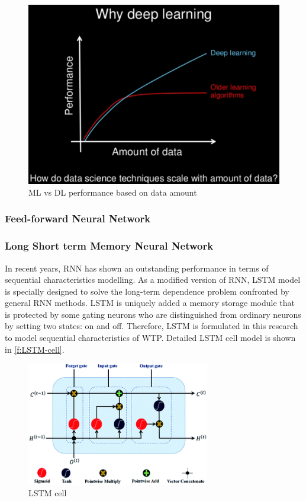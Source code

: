 \begin{figure}[h]
\centering
\includegraphics[width=12cm]{figures/Ch2/MlvsDL-data-amount.png}
\caption{ML vs DL performance based on data amount}
\label{f:ML-vs-DL-data-amount}
\end{figure}

\subsubsection{Feed-forward Neural Network}
\subsubsection{Long Short term Memory Neural Network}
In recent years, RNN has shown an outstanding performance in terms of sequential characteristics modelling. As a modified version of RNN, \ac{LSTM} model is specially designed to solve the long-term dependence problem confronted by general RNN methods. LSTM is uniquely added a memory storage module that is protected by some gating neurons who are distinguished from ordinary neurons by setting two states: on and off. Therefore, LSTM is formulated in this research to model sequential characteristics of WTP. Detailed \ac{LSTM} cell model is shown in \autoref{f:LSTM-cell}.

\begin{figure}[h]
\centering
\includegraphics[width=8cm]{figures/Ch2/LSTM_cell.png}
\caption{LSTM cell}
\label{f:LSTM-cell}
\end{figure}

